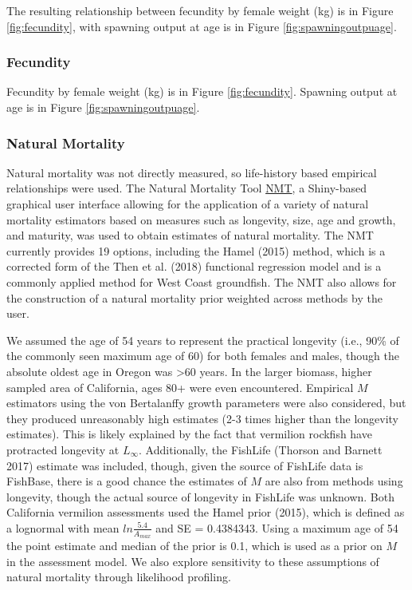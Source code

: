 \documentclass[
  english,
  a4paper,
]{article}
\begin{document}
The resulting relationship between fecundity by female weight (kg) is in Figure \ref{fig:fecundity}, with spawning output at age is in Figure \ref{fig:spawningoutpuage}.

\hypertarget{fecundity-1}{%
\subsubsection{Fecundity}\label{fecundity-1}}

Fecundity by female weight (kg) is in Figure \ref{fig:fecundity}.
Spawning output at age is in Figure \ref{fig:spawningoutpuage}.

\hypertarget{natural-mortality}{%
\subsubsection{Natural Mortality}\label{natural-mortality}}

Natural mortality was not directly measured, so life-history based empirical
relationships were used. The Natural Mortality Tool
\href{https://github.com/shcaba/Natural-Mortality-Tool}{NMT}, a Shiny-based
graphical user interface allowing for the application of a variety of natural
mortality estimators based on measures such as longevity, size, age and growth,
and maturity, was used to obtain estimates of natural mortality. The NMT currently
provides 19 options, including the Hamel (2015) method, which is a corrected
form of the Then et al. (2018) functional regression model and is a commonly
applied method for West Coast groundfish. The NMT also allows for the construction
of a natural mortality prior weighted across methods by the user.

We assumed the age of 54 years to represent the practical longevity (i.e., 90\% of
the commonly seen maximum age of 60) for both females and males, though the absolute
oldest age in Oregon was \textgreater60 years. In the larger biomass, higher sampled area of
California, ages 80+ were even encountered. Empirical \(M\) estimators using the von
Bertalanffy growth parameters were also considered, but they produced unreasonably
high estimates (2-3 times higher than the longevity estimates). This is likely
explained by the fact that vermilion rockfish have protracted longevity at \(L_{\infty}\).
Additionally, the FishLife (Thorson and Barnett 2017) estimate was included, though, given
the source of FishLife data is FishBase, there is a good chance the estimates of
\(M\) are also from methods using longevity, though the actual source of longevity
in FishLife was unknown.
Both California vermilion assessments used the Hamel prior (2015), which
is defined as a lognormal with mean \(ln\frac{5.4}{A_{max}}\) and SE = 0.4384343.
Using a maximum age of 54 the point estimate and median of the prior is 0.1, which
is used as a prior on \(M\) in the assessment model. We also explore sensitivity to
these assumptions of natural mortality through likelihood profiling.
\end{document}
